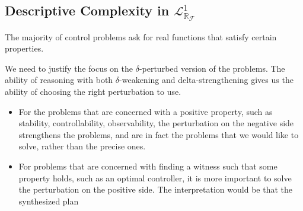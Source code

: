 \documentclass[10pt]{article}
\newcommand{\lrf}{\mathcal{L}_{\mathbb{R}_{\mathcal{F}}}}
\theoremstyle{definition}
\begin{document}
\subsection{Descriptive Complexity in $\lrf^1$} 

The majority of control problems ask for real functions that satisfy certain properties. 

We need to justify the focus on the $\delta$-perturbed version of the problems. The ability of reasoning with both $\delta$-weakening and delta-strengthening gives us the ability of choosing the right perturbation to use. 
\begin{itemize}
\item For the problems that are concerned with a positive property, such as stability, controllability, observability, the perturbation on the negative side strengthens the problems, and are in fact the problems that we would like to solve, rather than the precise ones. 
\item For problems that are concerned with finding a witness such that some property holds, such as an optimal controller, it is more important to solve the perturbation on the positive side. The interpretation would be that the synthesized plan 
\end{itemize}
\end{document}
